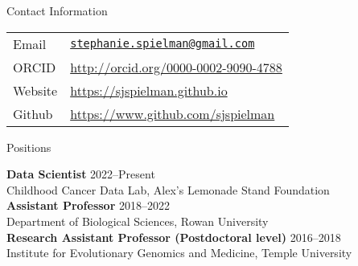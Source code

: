 \documentclass{resume} %
\begin{document}
\vspace*{0.5cm}
\begin{rSection}{Contact Information}
\vspace*{0.25cm}

\begin{table}[H]
	\begin{tabular}{ll}
		Email & \texttt{\href{mailto:stephanie.spielman@gmail.com}{stephanie.spielman@gmail.com}} \\
		ORCID & \url{http://orcid.org/0000-0002-9090-4788} \\
		Website & \url{https://sjspielman.github.io} \\
		Github &  \url{https://www.github.com/sjspielman} \\
	\end{tabular}
\end{table}
\end{rSection}
\vspace*{-0.45cm}



\begin{rSection}{Positions}
\vspace*{0.25cm}


{\bf Data Scientist} \hfill {2022--Present} \\
Childhood Cancer Data Lab, Alex's Lemonade Stand Foundation \\


{\bf Assistant Professor} \hfill {2018--2022} \\
Department of Biological Sciences, Rowan University \\


{\bf Research Assistant Professor (Postdoctoral level)} \hfill {2016--2018} \\
Institute for Evolutionary Genomics and Medicine, Temple University \\
\end{rSection}
\end{document}
